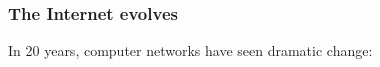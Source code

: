 \documentclass[svgnames]{beamer}
\begin{document}
\begin{frame}
\frametitle{The Internet evolves}

\large

In 20 years, computer networks have seen dramatic change:

\vspace{\baselineskip}

\begin{columns}

\begin{column}{0.5\textwidth}



\end{column}
\end{columns}
\end{frame}
\end{document}
